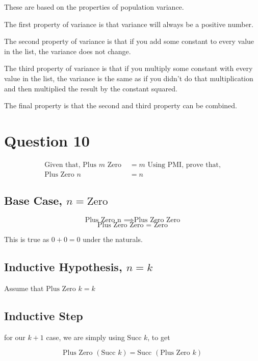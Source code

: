 \documentclass{article}
\begin{document}
These are based on the properties of population variance.

The first property of variance is that variance will always be a positive number.

The second property of variance is that if you add some constant to every value in the list, the variance does not change.

The third property of variance is that if you multiply some constant with every value in the list, the variance is the same as if you didn't do that multiplication and then multiplied the result by the constant squared.

The final property is that the second and third property can be combined.

\clearpage

\section{Question 10}

$$
\begin{aligned}
\text{Given that, Plus } m \text{ Zero } & = m \text{ Using PMI, prove that,}\\
\text{Plus Zero } n & = n 
\end{aligned}
$$

\subsection{\textbf{Base Case}, $n = \text{Zero}$}

    $$
    \text{Plus Zero n } \implies \text{Plus Zero Zero}
    $$
    $$
    \text{Plus Zero Zero } = \text{ Zero}
    $$

    This is true as $0 + 0 = 0$ under the naturals.

\subsection{\textbf{Inductive Hypothesis}, $n = k$}

    Assume that $\text{Plus Zero } k = k$
        
\subsection{\textbf{Inductive Step}}

    for our $k + 1$ case, we are simply using $\text{Succ } k$, to get

    $$
    \text{Plus Zero } ( \text{Succ } k ) = \text{Succ } ( \text{Plus Zero } k )
    $$
\end{document}
